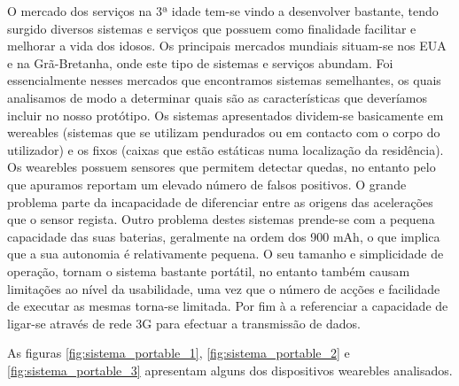 O mercado dos serviços na 3ª idade tem-se vindo a desenvolver bastante, tendo surgido diversos sistemas e serviços que possuem como finalidade facilitar e melhorar a vida dos idosos. Os principais mercados mundiais\cite{relatorio} situam-se nos EUA e na Grã-Bretanha, onde este tipo de sistemas e serviços abundam. Foi essencialmente nesses mercados que encontramos sistemas semelhantes, os quais analisamos de modo a determinar quais são as características que deveríamos incluir no nosso protótipo.
Os sistemas apresentados dividem-se basicamente em wereables (sistemas que se utilizam pendurados ou em contacto com o corpo do utilizador) e os fixos (caixas que estão estáticas numa localização da residência).
Os wearebles possuem sensores que permitem detectar quedas, no entanto pelo que apuramos reportam um elevado número de falsos positivos. O grande problema parte da incapacidade de diferenciar entre as origens das acelerações que o sensor regista. Outro problema destes sistemas prende-se com a pequena capacidade das suas baterias, geralmente na ordem dos 900 mAh, o que implica que a sua autonomia é relativamente pequena. O seu tamanho e simplicidade de operação, tornam o sistema bastante portátil, no entanto também causam limitações ao nível da usabilidade, uma vez que o número de acções e facilidade de executar as mesmas torna-se limitada. Por fim à a referenciar a capacidade de ligar-se através de rede 3G para efectuar a transmissão de dados.

As figuras \ref{fig:sistema_portable_1}, \ref{fig:sistema_portable_2} e \ref{fig:sistema_portable_3} apresentam alguns dos dispositivos wearebles analisados.

